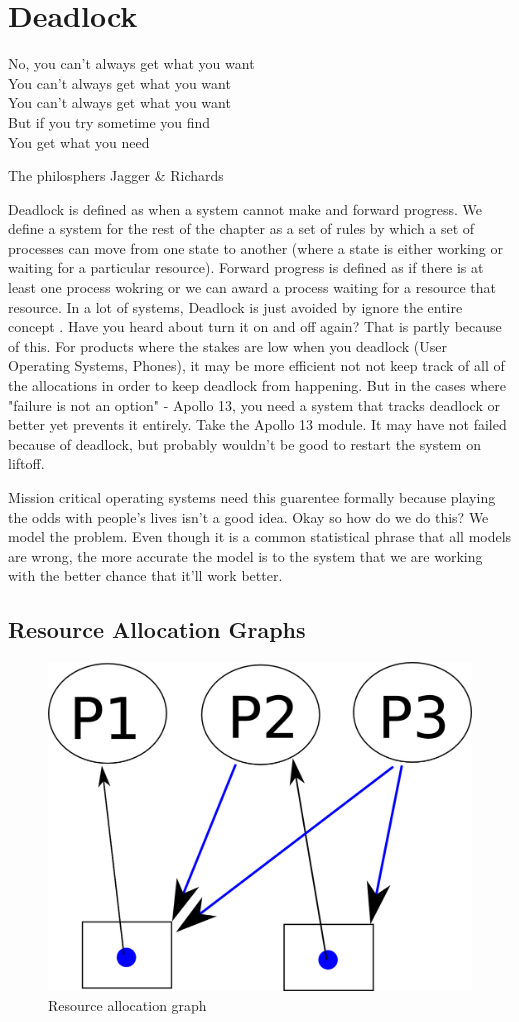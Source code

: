 \chapter{Deadlock}

\epigraph{No, you can't always get what you want
\\You can't always get what you want
\\You can't always get what you want
\\But if you try sometime you find
\\You get what you need}{The philosphers Jagger \& Richards}

\gls{Deadlock} is defined as when a system cannot make and forward progress. We define a system for the rest of the chapter as a set of rules by which a set of processes can move from one state to another (where a state is either working or waiting for a particular resource). Forward progress is defined as if there is at least one process wokring or we can award a process waiting for a resource that resource. In a lot of systems, Deadlock is just avoided by ignore the entire concept \cite[P.237]{silberschatz2006operating}. Have you heard about turn it on and off again? That is partly because of this. For products where the stakes are low when you deadlock (User Operating Systems, Phones), it may be more efficient not not keep track of all of the allocations in order to keep deadlock from happening. But in the cases where "failure is not an option" - Apollo 13, you need a system that tracks deadlock or better yet prevents it entirely. Take the Apollo 13 module. It may have not failed because of deadlock, but probably wouldn't be good to restart the system on liftoff.

Mission critical operating systems need this guarentee formally because playing the odds with people's lives isn't a good idea. Okay so how do we do this? We model the problem. Even though it is a common statistical phrase that all models are wrong, the more accurate the model is to the system that we are working with the better chance that it'll work better.

\section{Resource Allocation Graphs}

\begin{figure}
  \begin{center}
\includegraphics[width=.25\textwidth]{deadlock/images/resource_allocation.png}
\end{center}
  \caption{Resource allocation graph}
\end{figure}

